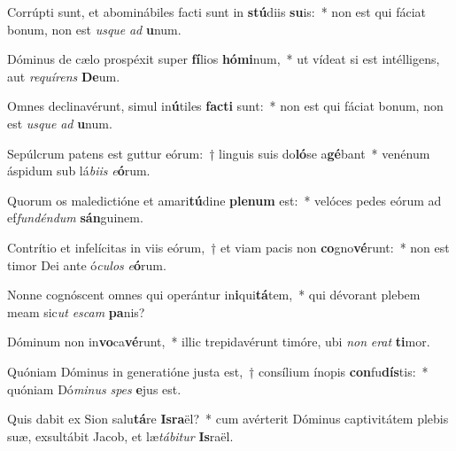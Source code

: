 \item Corrúpti sunt, et abominábiles facti sunt in \textbf{stú}diis \textbf{su}is:~* non est qui fáciat bonum, non est \textit{us}\textit{que} \textit{ad} \textbf{u}num.
\item Dóminus de cælo prospéxit super \textbf{fí}lios \textbf{hó}\textbf{mi}num,~* ut vídeat si est intélligens, aut \textit{re}\textit{quí}\textit{rens} \textbf{De}um.
\item Omnes declinavérunt, simul in\textbf{ú}tiles \textbf{fac}\textbf{ti} sunt:~* non est qui fáciat bonum, non est \textit{us}\textit{que} \textit{ad} \textbf{u}num.
\item Sepúlcrum patens est guttur eórum:~† linguis suis do\textbf{ló}se a\textbf{gé}bant~* venénum áspidum sub lá\textit{bi}\textit{is} \textit{e}\textbf{ó}rum.
\item Quorum os maledictióne et amari\textbf{tú}dine \textbf{ple}\textbf{num} est:~* velóces pedes eórum ad ef\textit{fun}\textit{dén}\textit{dum} \textbf{sán}guinem.
\item Contrítio et infelícitas in viis eórum,~† et viam pacis non \textbf{co}gno\textbf{vé}runt:~* non est timor Dei ante ó\textit{cu}\textit{los} \textit{e}\textbf{ó}rum.
\item Nonne cognóscent omnes qui operántur in\textbf{i}qui\textbf{tá}tem,~* qui dévorant plebem meam sic\textit{ut} \textit{es}\textit{cam} \textbf{pa}nis?
\item Dóminum non in\textbf{vo}ca\textbf{vé}runt,~* illic trepidavérunt timóre, ubi \textit{non} \textit{e}\textit{rat} \textbf{ti}mor.
\item Quóniam Dóminus in generatióne justa est,~† consílium ínopis \textbf{con}fu\textbf{dís}tis:~* quóniam Dó\textit{mi}\textit{nus} \textit{spes} \textbf{e}jus est.
\item Quis dabit ex Sion salu\textbf{tá}re \textbf{Is}\textbf{ra}ël?~* cum avérterit Dóminus captivitátem plebis suæ, exsultábit Jacob, et læ\textit{tá}\textit{bi}\textit{tur} \textbf{Is}raël.
